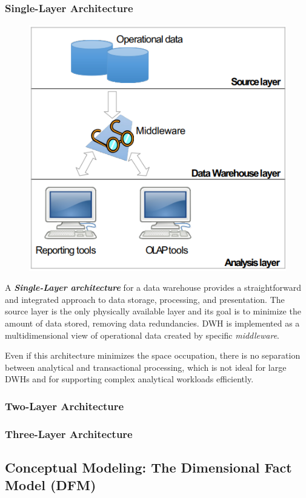 \subsubsection{Single-Layer Architecture}
\begin{figure}[ht!]
    \centering
    \includegraphics[scale=0.7]{images/DWH_single_layer.png}
\end{figure}
A \textit{\textbf{Single-Layer architecture}} for a data warehouse provides a straightforward and integrated approach to data storage, processing, and presentation. The source layer is the only physically available layer and its goal is to minimize the amount of data stored, removing data redundancies. DWH is implemented as a multidimensional view of operational data created by specific \textit{middleware}.

Even if this architecture minimizes the space occupation, there is no separation between analytical and transactional processing, which is not ideal for large DWHs and for supporting complex analytical workloads efficiently.

\subsubsection{Two-Layer Architecture}


\subsubsection{Three-Layer Architecture}


\subsection{Conceptual Modeling: The Dimensional Fact Model (DFM)}

